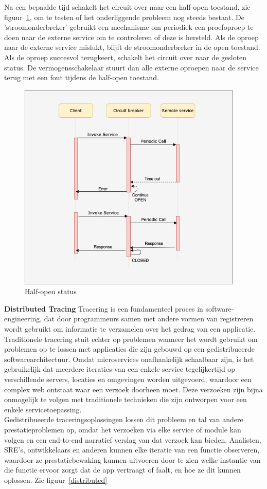 Na een bepaalde tijd schakelt het circuit over naar een half-open toestand, zie figuur~\ref{halfopen}, om te testen of het onderliggende probleem nog steeds bestaat. De 'stroomonderbreker' gebruikt een mechanisme om periodiek een proefoproep te doen naar de externe service om te controleren of deze is hersteld. Als de oproep naar de externe service mislukt, blijft de stroomonderbreker in de open toestand. Als de oproep succesvol terugkeert, schakelt het circuit over naar de gesloten status. De vermogensschakelaar stuurt dan alle externe oproepen naar de service terug met een fout tijdens de half-open toestand.

\begin{figure}[!htb]
    \centering
    \includegraphics[height=10cm]{half-open.png}
    \caption{Half-open status \label{halfopen}}
\end{figure}

\textbf{Distributed Tracing}
Tracering is een fundamenteel proces in software-engineering, dat door programmeurs samen met andere vormen van registreren wordt gebruikt om informatie te verzamelen over het gedrag van een applicatie. Traditionele tracering stuit echter op problemen wanneer het wordt gebruikt om problemen op te lossen met applicaties die zijn gebouwd op een gedistribueerde softwarearchitectuur. Omdat microservices onafhankelijk schaalbaar zijn, is het gebruikelijk dat meerdere iteraties van een enkele service tegelijkertijd op verschillende servers, locaties en omgevingen worden uitgevoerd, waardoor een complex web ontstaat waar een verzoek doorheen moet. Deze verzoeken zijn bijna onmogelijk te volgen met traditionele technieken die zijn ontworpen voor een enkele servicetoepassing.
\\
Gedistribueerde traceringsoplossingen lossen dit probleem en tal van andere prestatieproblemen op, omdat het verzoeken via elke service of module kan volgen en een end-to-end narratief verslag van dat verzoek kan bieden. Analisten, SRE's, ontwikkelaars en anderen kunnen elke iteratie van een functie observeren, waardoor ze prestatiebewaking kunnen uitvoeren door te zien welke instantie van die functie ervoor zorgt dat de app vertraagt of faalt, en hoe ze dit kunnen oplossen. Zie figuur~\ref{distributed}

